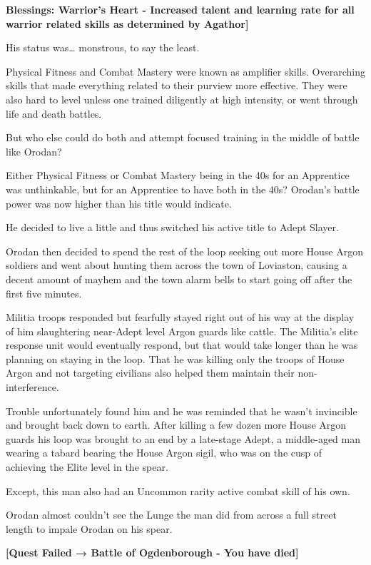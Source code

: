 \documentclass[a4paper,10pt]{book}
\begin{document}
\textbf{Blessings: Warrior’s Heart - Increased talent and learning rate for all warrior related skills as determined by Agathor]}\par
His status was… monstrous, to say the least.\par
Physical Fitness and Combat Mastery were known as amplifier skills. Overarching skills that made everything related to their purview more effective. They were also hard to level unless one trained diligently at high intensity, or went through life and death battles.\par
But who else could do both and attempt focused training in the middle of battle like Orodan?\par
Either Physical Fitness or Combat Mastery being in the 40s for an Apprentice was unthinkable, but for an Apprentice to have both in the 40s? Orodan’s battle power was now higher than his title would indicate.\par
He decided to live a little and thus switched his active title to Adept Slayer.\par
Orodan then decided to spend the rest of the loop seeking out more House Argon soldiers and went about hunting them across the town of Loviaston, causing a decent amount of mayhem and the town alarm bells to start going off after the first five minutes.\par
Militia troops responded but fearfully stayed right out of his way at the display of him slaughtering near-Adept level Argon guards like cattle. The Militia’s elite response unit would eventually respond, but that would take longer than he was planning on staying in the loop. That he was killing only the troops of House Argon and not targeting civilians also helped them maintain their non-interference.\par
Trouble unfortunately found him and he was reminded that he wasn’t invincible and brought back down to earth. After killing a few dozen more House Argon guards his loop was brought to an end by a late-stage Adept, a middle-aged man wearing a tabard bearing the House Argon sigil, who was on the cusp of achieving the Elite level in the spear.\par
Except, this man also had an Uncommon rarity active combat skill of his own.\par
Orodan almost couldn’t see the Lunge the man did from across a full street length to impale Orodan on his spear.\par
\textbf{[Quest Failed → Battle of Ogdenborough - You have died]}\par
\end{document}
